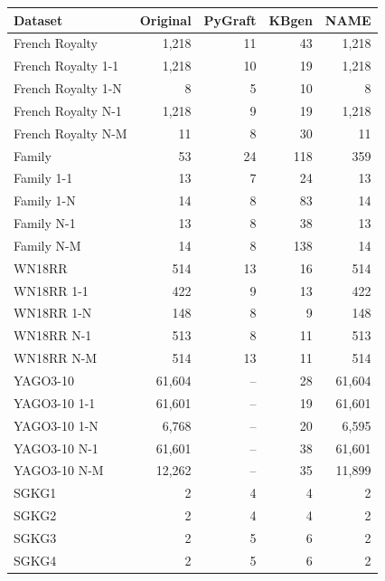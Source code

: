 \begin{tabular}{lrrrr}
\toprule
Dataset & Original & PyGraft & KBgen & NAME \\
\midrule
French Royalty & 1{,}218 & 11 & 43 & 1{,}218 \\
French Royalty 1-1 & 1{,}218 & 10 & 19 & 1{,}218 \\
French Royalty 1-N & 8 & 5 & 10 & 8 \\
French Royalty N-1 & 1{,}218 & 9 & 19 & 1{,}218 \\
French Royalty N-M & 11 & 8 & 30 & 11 \\
\midrule
Family & 53 & 24 & 118 & 359 \\
Family 1-1 & 13 & 7 & 24 & 13 \\
Family 1-N & 14 & 8 & 83 & 14 \\
Family N-1 & 13 & 8 & 38 & 13 \\
Family N-M & 14 & 8 & 138 & 14 \\
\midrule
WN18RR & 514 & 13 & 16 & 514 \\
WN18RR 1-1 & 422 & 9 & 13 & 422 \\
WN18RR 1-N & 148 & 8 & 9 & 148 \\
WN18RR N-1 & 513 & 8 & 11 & 513 \\
WN18RR N-M & 514 & 13 & 11 & 514 \\
\midrule
YAGO3-10 & 61{,}604 & – & 28 & 61{,}604 \\
YAGO3-10 1-1 & 61{,}601 & – & 19 & 61{,}601 \\
YAGO3-10 1-N & 6{,}768 & – & 20 & 6{,}595 \\
YAGO3-10 N-1 & 61{,}601 & – & 38 & 61{,}601 \\
YAGO3-10 N-M & 12{,}262 & – & 35 & 11{,}899 \\
\midrule
SGKG1 & 2 & 4 & 4 & 2 \\
SGKG2 & 2 & 4 & 4 & 2 \\
SGKG3 & 2 & 5 & 6 & 2 \\
SGKG4 & 2 & 5 & 6 & 2 \\
\bottomrule
\end{tabular}
